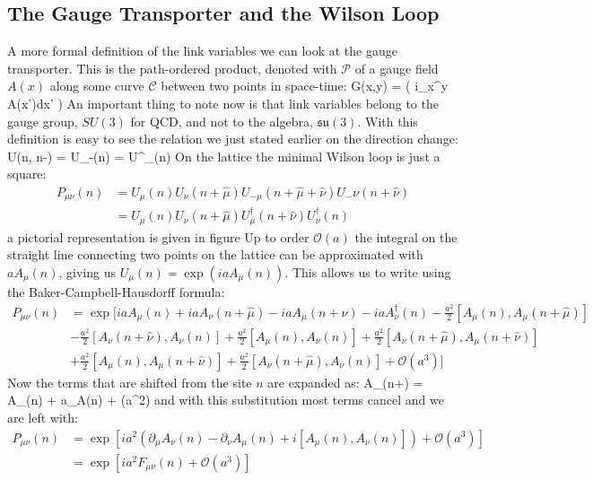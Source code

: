 \subsection{The Gauge Transporter and the Wilson Loop}
A more formal definition of the link variables we can look at the gauge transporter. This is the path-ordered product, denoted with $\mathcal{P}$ of a gauge field $A(x)$ along some curve $\mathcal{C}$ between two points in space-time:
\beq
    G(x,y) =  \exp\left( i\int_x^y A(x')dx'  \right)
\eeq
An important thing to note now is that link variables belong to the gauge group, $SU(3)$ for QCD, and not to the algebra, $\mathfrak{su}(3)$. With this definition is easy to see the relation we just stated earlier on the direction change:
\beq
    U(n, n-\hat\mu) = U_{-\mu}(n) = U^\dagger_\mu(n)
\eeq
{}
On the lattice the minimal Wilson loop is just a square:
\begin{align}
P_{\mu\nu}(n) &= U_\mu(n) U_\nu(n+\hat\mu) U_{-\mu}(n+\hat\mu+\hat\nu) U_-{\nu}(n+\hat\nu)  \\\nonumber
              &= U_\mu(n) U_\nu(n+\hat\mu) U^\dagger_\mu(n+\hat\nu) U^\dagger_\nu(n)
\label{plaquette}
\end{align}
a pictorial representation is given in figure%
Up to order $\mathcal{O}(a)$ the integral on the straight line connecting two points on the lattice can be approximated with $aA_\mu(n)$, giving us $U_\mu (n) = \exp(iaA_\mu(n))$. This allows us to write using the Baker-Campbell-Hausdorff formula:
\begin{align}
P_{\mu\nu}(n) &=\exp\bigg[iaA_\mu(n) + iaA_\nu(n+\hat\mu) -iaA_\mu(n+\hat\nu) -iaA^\dagger_\nu(n) - \frac{a^2}{2}[A_\mu(n), A_\mu(n+\hat\mu)] \\\nonumber
              & - \frac{a^2}{2}[A_\nu(n+\hat\nu), A_\nu(n)] + \frac{a^2}{2}[A_\mu(n), A_\nu(n)] + \frac{a^2}{2}[A_\nu(n+\hat\mu), A_\mu(n+\hat\nu)] \\\nonumber
              & + \frac{a^2}{2}[A_\mu(n), A_\mu(n+\hat\nu)] + \frac{a^2}{2}[A_\nu(n+\hat\mu), A_\nu(n)] + \mathcal{O}(a^3)\bigg]
\end{align}
Now the terms that are shifted from the site $n$ are expanded as:
\beq
    A_\mu(n+\hat\nu) = A_\mu(n) + a\partial_\nu A\mu(n) +  (a^2)
\eeq
and with this substitution most terms cancel and we are left with:
\begin{align}
    P_{\mu\nu}(n) &=\exp\left[ ia^2(\partial_\mu A_\nu(n) - \partial_\nu A_\mu(n) + i[A_\mu(n),A_\nu(n)]) + \mathcal{O}(a^3)  \right]\\\nonumber
                  &=\exp\left[ ia^2F_{\mu\nu}(n) + \mathcal{O}(a^3)  \right]
\end{align}
